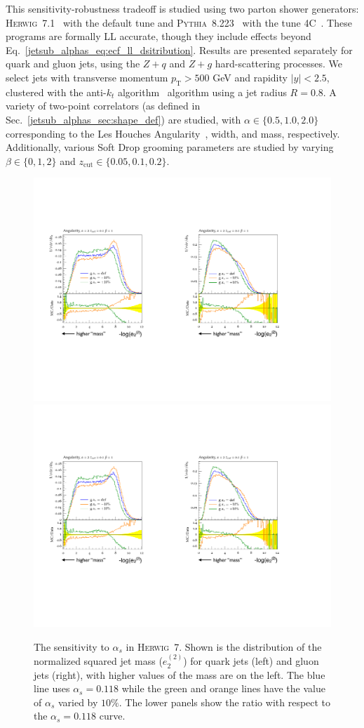 \documentclass[11pt]{cernrep}
\begin{document}
This sensitivity-robustness tradeoff is studied using two parton shower generators: \textsc{Herwig~7}.1~\cite{Bellm:2015jjp,Reichelt:2017hts} with the default tune and \textsc{Pythia~8}.223~\cite{Sjostrand:2006za,Sjostrand:2014zea} with the tune 4C~\cite{Corke:2010yf}.  
%
These programs are formally LL accurate, though they include effects beyond Eq.~\eqref{jetsub_alphas_eq:ecf_ll_dsitribution}.
%
Results are presented separately for quark and gluon jets, using the $Z+q$ and $Z+g$ hard-scattering processes.
%
We select jets with transverse momentum $p_\mathrm{T}>500$ GeV and rapidity $|y|<2.5$, clustered with the anti-$k_t$ algorithm~\cite{Cacciari:2008gp} algorithm using a jet radius $R=0.8$.
%
A variety of two-point correlators (as defined in Sec.~\ref{jetsub_alphas_sec:shape_def}) are studied, with $\alpha\in\{0.5,1.0, 2.0\}$ corresponding to the Les Houches Angularity~\cite{Gras:2017jty}, width, and mass, respectively. 
%
Additionally, various Soft Drop grooming parameters are studied by varying $\beta\in\{0,1,2\}$ and $z_\mathrm{cut}\in \{0.05,0.1,0.2\}$.  

\begin{figure}[p]
\begin{center}
\includegraphics[width = 0.49\columnwidth]{jetsub_alphas_Sensitivity2a.pdf}\includegraphics[width = 0.48\columnwidth]{jetsub_alphas_Sensitivity2b.pdf}
\end{center}
\caption{The sensitivity to $\alpha_s$ in \textsc{Herwig~7}.  Shown is the distribution of the normalized squared jet mass ($e_2^{(2)}$) for quark jets (left) and gluon jets (right), with higher values of the mass are on the left.  The blue line uses $\alpha_s=0.118$ while the green and orange lines have the value of $\alpha_s$ varied by $10\%$.  The lower panels show the ratio with respect to the $\alpha_s=0.118$ curve.}
\label{jetsub_alphas_fig:sensitivity}
\end{figure}
\end{document}
